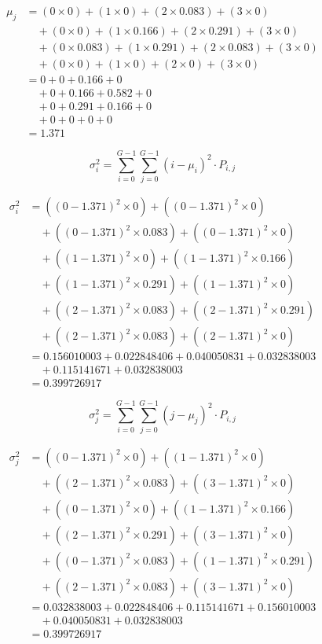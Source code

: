 \begin{align*}
\mu_j &= (0 \times 0) + (1 \times 0) + (2 \times 0.083) + (3 \times 0) \\
&\quad + (0 \times 0) + (1 \times 0.166) + (2 \times 0.291) + (3 \times 0) \\
&\quad + (0 \times 0.083) + (1 \times 0.291) + (2 \times 0.083) + (3 \times 0) \\
&\quad + (0 \times 0) + (1 \times 0) + (2 \times 0) + (3 \times 0) \\
&= 0 + 0 + 0.166 + 0 \\
&\quad + 0 + 0.166 + 0.582 + 0 \\
&\quad + 0 + 0.291 + 0.166 + 0 \\
&\quad + 0 + 0 + 0 + 0 \\
&= 1.371
\end{align*}


\[
\sigma_i^2 = \sum_{i=0}^{G-1} \sum_{j=0}^{G-1} (i - \mu_i)^2 \cdot P_{i,j}
\]

\begin{align*}
\sigma_i^2 &= ((0 - 1.371)^2 \times 0) + ((0 - 1.371)^2 \times 0) \\
&\quad + ((0 - 1.371)^2 \times 0.083) + ((0 - 1.371)^2 \times 0) \\
&\quad + ((1 - 1.371)^2 \times 0) + ((1 - 1.371)^2 \times 0.166) \\
&\quad + ((1 - 1.371)^2 \times 0.291) + ((1 - 1.371)^2 \times 0) \\
&\quad + ((2 - 1.371)^2 \times 0.083) + ((2 - 1.371)^2 \times 0.291) \\
&\quad + ((2 - 1.371)^2 \times 0.083) + ((2 - 1.371)^2 \times 0) \\
&= 0.156010003 + 0.022848406 + 0.040050831 + 0.032838003 \\
&\quad + 0.115141671 + 0.032838003 \\
&= 0.399726917
\end{align*}

\[
\sigma_j^2 = \sum_{i=0}^{G-1} \sum_{j=0}^{G-1} (j - \mu_j)^2 \cdot P_{i,j}
\]

\begin{align*}
\sigma_j^2 &= ((0 - 1.371)^2 \times 0) + ((1 - 1.371)^2 \times 0) \\
&\quad + ((2 - 1.371)^2 \times 0.083) + ((3 - 1.371)^2 \times 0) \\
&\quad + ((0 - 1.371)^2 \times 0) + ((1 - 1.371)^2 \times 0.166) \\
&\quad + ((2 - 1.371)^2 \times 0.291) + ((3 - 1.371)^2 \times 0) \\
&\quad + ((0 - 1.371)^2 \times 0.083) + ((1 - 1.371)^2 \times 0.291) \\
&\quad + ((2 - 1.371)^2 \times 0.083) + ((3 - 1.371)^2 \times 0) \\
&= 0.032838003 + 0.022848406 + 0.115141671 + 0.156010003 \\
&\quad + 0.040050831 + 0.032838003 \\
&= 0.399726917
\end{align*}

